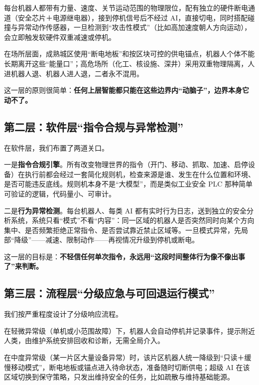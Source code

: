 每台机器人都带有力量、速度、关节运动范围的物理限位，配有独立的硬件断电通道（安全芯片＋电源继电器），接到停机信号后不经过 AI，直接切电，同时搭配碰撞与异常动作传感器，一旦检测到``攻击性模式''（比如高加速度朝人方向运动），会立即触发软硬件双重减速或停机。

在场所层面，成熟城区使用``断电地板''和按区块可控的供电锚点，机器人个体不能长期离开这些``能量口''；高危场所（化工、核设施、深井）采用双重物理隔离，人进机器人退、机器人进人退，二者永不混用。

这一层的原则很简单：\textbf{任何上层智能都只能在这些边界内``动脑子''，边界本身它动不了。}

\subsection{第二层：软件层``指令合规与异常检测''}\label{ux7b2cux4e8cux5c42ux8f6fux4ef6ux5c42ux6307ux4ee4ux5408ux89c4ux4e0eux5f02ux5e38ux68c0ux6d4b}

在软件层，我们布置了两道关口。

一是\textbf{指令合规引擎}。所有改变物理世界的指令（开门、移动、抓取、加速、启停设备）在执行前都会经过一套简化规则机，检查来源是谁、发生在什么位置和环境、是否可能违反底线。规则机本身不是``大模型''，而是类似工业安全 PLC 那种简单可验证的逻辑，代码量小、可审计。

二是\textbf{行为异常检测}。每台机器人、每类 AI 都有实时行为日志，送到独立的安全分析系统，系统只看``模式''不看``内容''：同一区域的机器人是否突然同时向某个方向集中、是否频繁拒绝正常指令、是否尝试靠近禁止区域等。一旦模式异常，先局部``降级''------减速、限制动作------再视情况升级到停机或断电。

这一层的目标是：\textbf{不轻信任何单次指令，永远用``这段时间整体行为像不像出事了''来判断。}

\subsection{第三层：流程层``分级应急与可回退运行模式''}\label{ux7b2cux4e09ux5c42ux6d41ux7a0bux5c42ux5206ux7ea7ux5e94ux6025ux4e0eux53efux56deux9000ux8fd0ux884cux6a21ux5f0f}

我们按严重程度设计了分级响应流程。

在轻微异常级（单机或小范围故障）下，机器人会自动停机并记录事件，提示附近人类，由维护系统安排回收和诊断，无需全局介入。

在中度异常级（某一片区大量设备异常）时，该片区机器人统一降级到``只读＋缓慢移动模式''，断电地板或锚点进入待命状态，准备随时切断供电；超级 AI 在该区域切换到保守策略，只发出维持安全的任务，比如疏散与维持基础能源。


